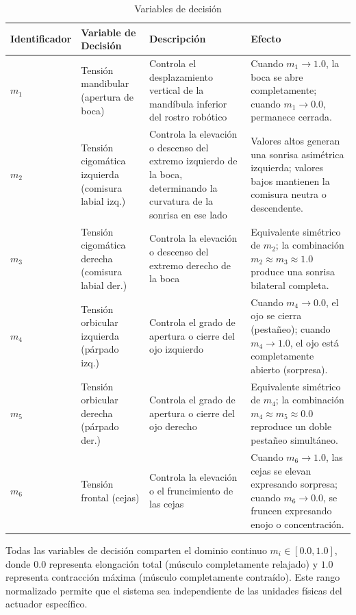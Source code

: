 \begin{table}[H]
    \centering
    \begin{tabularx}{\textwidth}{|l|l|X|X|}
        \hline
        \textbf{Identificador} & \textbf{Variable de Decisión} & \textbf{Descripción} & \textbf{Efecto} \\
        \hline
        $m_1$ & Tensión mandibular (apertura de boca) & Controla el desplazamiento vertical de la mandíbula inferior del rostro robótico & Cuando $m_1 \to 1.0$, la boca se abre completamente; cuando $m_1 \to 0.0$, permanece cerrada. \\
        \hline
        $m_2$ & Tensión cigomática izquierda (comisura labial izq.) & Controla la elevación o descenso del extremo izquierdo de la boca, determinando la curvatura de la sonrisa en ese lado & Valores altos generan una sonrisa asimétrica izquierda; valores bajos mantienen la comisura neutra o descendente. \\
        \hline
        $m_3$ & Tensión cigomática derecha (comisura labial der.) & Controla la elevación o descenso del extremo derecho de la boca & Equivalente simétrico de $m_2$; la combinación $m_2 \approx m_3 \approx 1.0$ produce una sonrisa bilateral completa. \\
        \hline
        $m_4$ & Tensión orbicular izquierda (párpado izq.) & Controla el grado de apertura o cierre del ojo izquierdo & Cuando $m_4 \to 0.0$, el ojo se cierra (pestañeo); cuando $m_4 \to 1.0$, el ojo está completamente abierto (sorpresa). \\
        \hline
        $m_5$ & Tensión orbicular derecha (párpado der.) & Controla el grado de apertura o cierre del ojo derecho & Equivalente simétrico de $m_4$; la combinación $m_4 \approx m_5 \approx 0.0$ reproduce un doble pestañeo simultáneo. \\
        \hline
        $m_6$ & Tensión frontal (cejas) & Controla la elevación o el fruncimiento de las cejas & Cuando $m_6 \to 1.0$, las cejas se elevan expresando sorpresa; cuando $m_6 \to 0.0$, se fruncen expresando enojo o concentración. \\
        \hline
    \end{tabularx}
    \caption{Variables de decisión}
    \label{TBL_VariablesDecision}
\end{table}

Todas las variables de decisión comparten el dominio continuo $m_i \in [0.0, 1.0]$, donde $0.0$ representa elongación total (músculo completamente relajado) y $1.0$ representa contracción máxima (músculo completamente contraído). Este rango normalizado permite que el sistema sea independiente de las unidades físicas del actuador específico.


